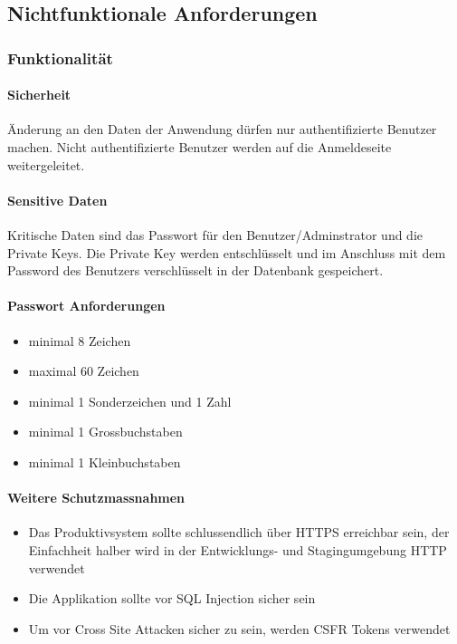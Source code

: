 \subsection{Nichtfunktionale Anforderungen}
\subsubsection{Funktionalität}
\paragraph{Sicherheit}
Änderung an den Daten der Anwendung dürfen nur authentifizierte Benutzer machen. Nicht authentifizierte Benutzer werden auf die Anmeldeseite weitergeleitet.

\paragraph{Sensitive Daten}
Kritische Daten sind das Passwort für den Benutzer/Adminstrator und die Private Keys. Die Private Key werden entschlüsselt und im Anschluss mit dem Password des Benutzers verschlüsselt in der Datenbank gespeichert.

\paragraph{Passwort Anforderungen}
\begin{itemize}
	\item minimal 8 Zeichen
	\item maximal 60 Zeichen
	\item minimal 1 Sonderzeichen und 1 Zahl
	\item minimal 1 Grossbuchstaben
	\item minimal 1 Kleinbuchstaben
\end{itemize}

\paragraph{Weitere Schutzmassnahmen}
\begin{itemize}
	\item Das Produktivsystem sollte schlussendlich über HTTPS erreichbar sein, der Einfachheit halber wird in der Entwicklungs- und Stagingumgebung HTTP verwendet
	\item Die Applikation sollte vor SQL Injection sicher sein
	\item Um vor Cross Site Attacken sicher zu sein, werden CSFR Tokens verwendet
\end{itemize}

